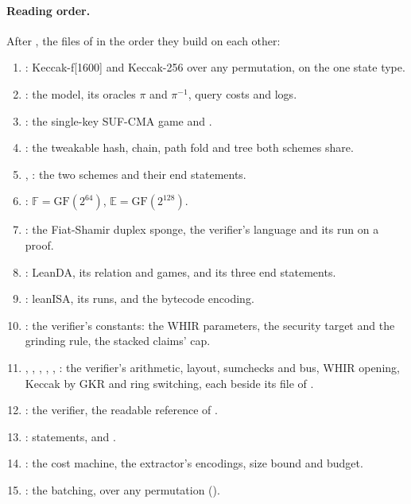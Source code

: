 \documentclass[11pt]{article}
\begin{document}
\paragraph{Reading order.} After , the files of  in the order they build on each other:
\begin{enumerate}\itemsep0pt
\item {}: Keccak-f[1600] and Keccak-256 over any permutation, on the one state type.
\item {}: the model, its oracles $\pi$ and $\pi^{-1}$, query costs and logs.
\item {}: the single-key SUF-CMA game and .
\item {}: the tweakable hash, chain, path fold and tree both schemes share.
\item {}, : the two schemes and their end statements.
\item {}: $\mathbb{F} = \mathrm{GF}(2^{64})$, $\mathbb{E} = \mathrm{GF}(2^{128})$.
\item {}: the Fiat-Shamir duplex sponge, the verifier's language and its run on a proof.
\item {}: LeanDA, its relation and games, and its three end statements.
\item {}: leanISA, its runs,  and the bytecode encoding.
\item {}: the verifier's constants: the WHIR parameters, the security target and the grinding rule, the stacked claims' cap.
\item {}, , , , , : the verifier's arithmetic, layout, sumchecks and bus, WHIR opening, Keccak by GKR and ring switching, each beside its file of .
\item {}: the verifier, the readable reference of .
\item {}: statements,  and .
\item {}: the cost machine, the extractor's encodings, size bound and budget.
\item {}: the batching, over any permutation ().

\end{enumerate}
\end{document}
